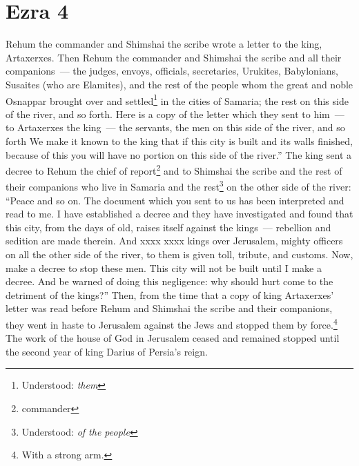 \section{Ezra 4}\label{Ezra 4}
\begin{enumerate}
     Rehum the commander and Shimshai the scribe wrote a letter to the king, Artaxerxes.%
     Then Rehum the commander and Shimshai the scribe and all their companions~--- the judges, envoys, officials, secretaries, Urukites, Babylonians, Susaites (who are Elamites),%
     and the rest of the people whom the great and noble Osnappar brought over and settled\footnote{Understood: \emph{them}} in the cities of Samaria; the rest on this side of the river, and so forth.%
     Here is a copy of the letter which they sent to him~--- to Artaxerxes the king~--- the servants, the men on this side of the river, and so forth%
     We make it known to the king that if this city is built and its walls finished, because of this you will have no portion on this side of the river.''%
     The king sent a decree to Rehum the chief of report\footnote{commander} and to Shimshai the scribe and the rest of their companions who live in Samaria and the rest\footnote{Understood: \emph{of the people}} on the other side of the river: ``Peace and so on.%
     The document which you sent to us has been interpreted and read to me.%
     I have established a decree and they have investigated and found that this city, from the days of old, raises itself against the kings~--- rebellion and sedition are made therein.%
     And xxxx xxxx kings over Jerusalem, mighty officers on all the other side of the river, to them is given toll, tribute, and customs.%
     Now, make a decree to stop these men. This city will not be built until I make a decree.%
     And be warned of doing this negligence: why should hurt come to the detriment of the kings?''%
     Then, from the time that a copy of king Artaxerxes' letter was read before Rehum and Shimshai the scribe and their companions, they went in haste to Jerusalem against the Jews and stopped them by force.\footnote{With a strong arm.}%
     The work of the house of God in Jerusalem ceased and remained stopped until the second year of king Darius of Persia's reign.%
\end{enumerate}
